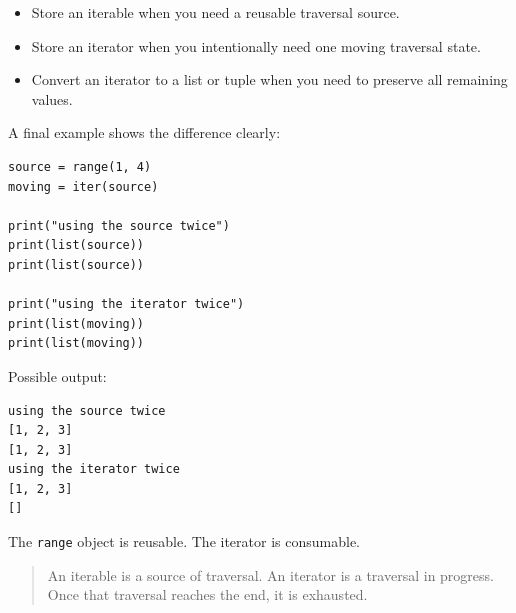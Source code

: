 \begin{itemize}
    \item Store an iterable when you need a reusable traversal source.
    \item Store an iterator when you intentionally need one moving traversal state.
    \item Convert an iterator to a list or tuple when you need to preserve all remaining values.
\end{itemize}

A final example shows the difference clearly:

\begin{verbatim}
source = range(1, 4)
moving = iter(source)

print("using the source twice")
print(list(source))
print(list(source))

print("using the iterator twice")
print(list(moving))
print(list(moving))
\end{verbatim}

Possible output:

\begin{verbatim}
using the source twice
[1, 2, 3]
[1, 2, 3]
using the iterator twice
[1, 2, 3]
[]
\end{verbatim}

The \texttt{range} object is reusable. The iterator is consumable.

\begin{quote}
An iterable is a source of traversal. An iterator is a traversal in progress. Once that traversal reaches the end, it is exhausted.
\end{quote}